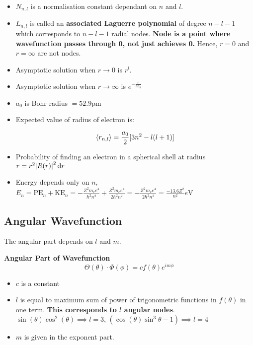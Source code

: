 \documentclass[11pt]{article}
\theoremstyle{definition}
\begin{document}
\begin{itemize}
 \setlength\itemsep{0.1em}
    \item $N_{n,l}$ is a normalisation constant dependant on $n$ and $l$.
    \item $L_{n,l}$ is called an \textbf{associated Laguerre polynomial} of degree $n-l-1$ which corresponds to $n-l-1$ radial nodes. \textbf{Node is a point where wavefunction passes through 0, not just achieves 0.} Hence, $r=0$ and $r=\infty$ are not nodes.
    \item Asymptotic solution when $r \to 0$ is $r^l$.
    \item Asymptotic solution when $r \to \infty$ is $e^{-\frac{r}{na_0}}$ 
    \item $a_0$ is Bohr radius $= 52.9 \unit{\pico \metre}$
\item Expected value of radius of electron is:

\begin{equation*}
    \expval{r_{n,l}} = \frac{a_0}{2}[3n^2 - l(l+1)]
\end{equation*}

\item Probability of finding an electron in a spherical shell at radius $r = r^2 \abs{R(r)}^2 \dd{r}$

\item Energy depends only on $n$, $E_n = \text{PE}_{n} + \text{KE}_{n} = -\frac{Z^2 m_e e^4}{\hbar^2 n^2} + \frac{Z^2 m_e e^4}{2 \hbar^2 n^2} = -\frac{Z^2 m_e e^4}{2 \hbar^2 n^2} = \frac{-13.6Z^2}{n^2} \unit{e \volt}$
\end{itemize}


\subsection{Angular Wavefunction}
The angular part depends on $l$ and $m$.


\begin{shaded}
\textbf{Angular Part of Wavefunction}
\begin{equation*}
    \Theta(\theta)\cdot \Phi(\phi) = c f(\theta) e^{im\phi}
\end{equation*}
\end{shaded}

\begin{itemize}
    \item $c$ is a constant
    \item $l$ is equal to maximum sum of power of trigonometric functions in $f(\theta)$ in one term. \textbf{This corresponds to $l$ angular nodes}. $\sin(\theta) \cos^2(\theta) \implies l = 3$, $(\cos(\theta) \sin^3{\theta} - 1) \implies l = 4$
    \item $m$ is given in the exponent part.
\end{itemize}
\end{document}
